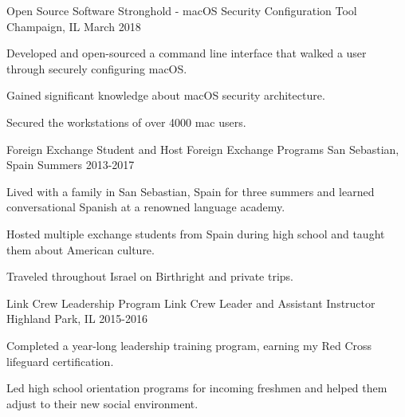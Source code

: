 

\begin{cventries}
\cventry
{Open Source Software} %
{Stronghold - macOS Security Configuration Tool} %
{Champaign, IL} %
{March 2018} %
{
	\begin{cvitems} %
		\item {Developed and open-sourced a command line interface that walked a user through securely configuring macOS.}
		\item{Gained significant knowledge about macOS security architecture.} 
		\item {Secured the workstations of over 4000 mac users.}
	\end{cvitems}
}
\cventry
{Foreign Exchange Student and Host} %
{Foreign Exchange Programs} %
{San Sebastian, Spain} %
{Summers 2013-2017} %
{
	\begin{cvitems} %
		\item {Lived with a family in San Sebastian, Spain for three summers and learned conversational Spanish at a renowned language academy.}
		\item {Hosted multiple exchange students from Spain during high school and taught them about American culture.}
		\item {Traveled throughout Israel on Birthright and private trips.}
	\end{cvitems}
}
\cventry
{Link Crew Leadership Program} %
{\newline Link Crew Leader and Assistant Instructor} %
{Highland Park, IL} %
{2015-2016} %
{
   \begin{cvitems} %
        \item {Completed a year-long leadership training program, earning my Red Cross lifeguard certification.}
        \item {Led high school orientation programs for incoming freshmen and helped them adjust to their new social environment.}
   \end{cvitems}
} 
\end{cventries}
